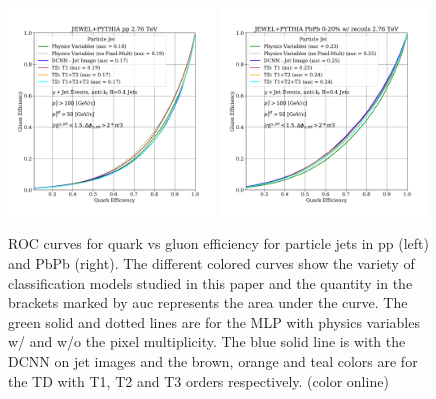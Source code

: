 \documentclass[notoc]{JHEP3}
\begin{document}
\begin{figure}[h]
	\centering
	\includegraphics[width=0.49\textwidth]{plots/JEWELPYTHIA_pp_2p76TeV_genLevel_QvsG.pdf}
	\includegraphics[width=0.49\textwidth]{plots/JEWELPYTHIA_PbPb_2p76TeV_genLevel_QvsG.pdf}
	\caption{ROC curves for quark vs gluon efficiency for particle jets in pp (left) and PbPb (right). The different colored curves show the variety of classification models studied in this paper and the quantity in the brackets marked by auc represents the area under the curve. The green solid and dotted lines are for the MLP with physics variables w/ and w/o the pixel multiplicity. The blue solid line is with the DCNN on jet images and the brown, orange and teal colors are for the TD with T1, T2 and T3 orders respectively. (color online)}
\label{fig:ROC_all}
\end{figure}
\end{document}
